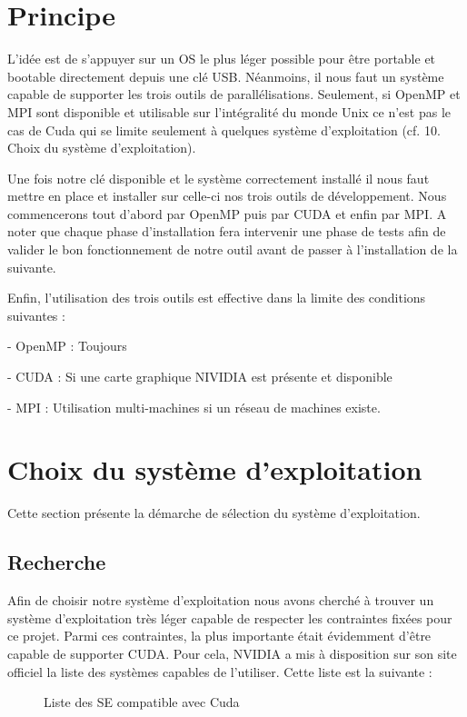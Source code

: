 \documentclass[final]{polytech/polytech}
\begin{document}
\section{Principe}
L’idée est de s’appuyer sur un OS le plus léger possible pour être portable et bootable directement depuis une clé USB. Néanmoins, il nous faut un système capable de supporter les trois outils de parallélisations. Seulement, si OpenMP et MPI sont disponible et utilisable sur l’intégralité du monde Unix ce n’est pas le cas de Cuda qui se limite seulement à quelques système d’exploitation (cf. 10. Choix du système d’exploitation).

Une fois notre clé disponible et le système correctement installé il nous faut mettre en place et installer sur celle-ci nos trois outils de développement.  Nous commencerons tout d’abord par OpenMP puis par CUDA et enfin par MPI. A noter que chaque phase d’installation fera intervenir une phase de tests afin de valider le bon fonctionnement de notre outil avant de passer à l’installation de la suivante.

Enfin, l’utilisation des trois outils est effective dans la limite des conditions suivantes :

- OpenMP : Toujours

- CUDA : Si une carte graphique NIVIDIA est présente et disponible

- MPI : Utilisation multi-machines si un réseau de machines existe.


\section{Choix du système d'exploitation}
Cette section présente la démarche de sélection du système d’exploitation.

\subsection{Recherche}
Afin de choisir notre système d’exploitation nous avons cherché à trouver un système d’exploitation très léger capable de respecter les contraintes fixées pour ce projet. Parmi ces contraintes, la plus importante était évidemment d’être capable de supporter CUDA. Pour cela, NVIDIA a mis à disposition sur son site officiel la liste des systèmes capables de l’utiliser. Cette liste est la suivante :

\vfill\eject

\begin{figure}
	\caption{Liste des SE compatible avec Cuda}
	\label{fig:cuda_working_os}
\end{figure}
\end{document}
